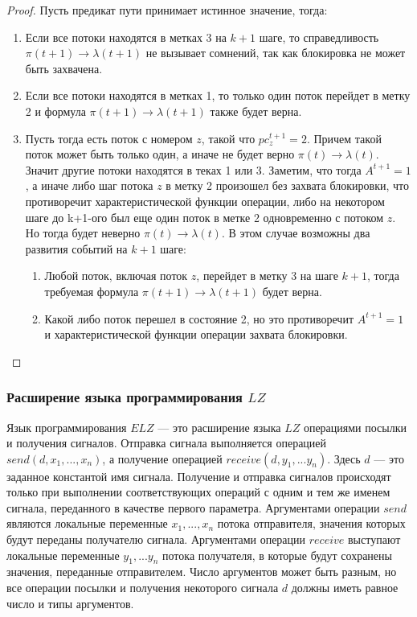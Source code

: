 \begin{proof}
Пусть предикат пути принимает истинное значение, тогда:
\begin{enumerate}
    \item Если все потоки находятся в метках 3 на $k+1$ шаге, то справедливость $\pi(t+1) \to \lambda(t+1)$ не вызывает сомнений, так как блокировка не может быть захвачена.
    \item Если все потоки находятся в метках 1, то только один поток перейдет в метку 2 и формула $\pi(t+1) \to \lambda(t+1)$ также будет верна.
    \item Пусть тогда есть поток с номером $z$, такой что $pc^{t+1}_z = 2$.
    Причем такой поток может быть только один, а иначе не будет верно $\pi(t) \to \lambda(t)$.
    Значит другие потоки находятся в теках 1 или 3.
    Заметим, что тогда $A^{t+1} = 1$, а иначе либо шаг потока $z$ в метку 2 произошел без захвата блокировки, что противоречит характеристической функции операции, либо на некотором шаге до k+1-ого был еще один поток в метке 2 одновременно с потоком $z$.
    Но тогда будет неверно $\pi(t) \to \lambda(t)$.
    В этом случае возможны два развития событий на $k+1$ шаге:
    \begin{enumerate}
        \item Любой поток, включая поток $z$, перейдет в метку 3 на шаге $k+1$, тогда требуемая формула $\pi(t+1) \to \lambda(t+1)$ будет верна.
        \item Какой либо поток перешел в состояние 2, но это противоречит $A^{t+1} = 1$ и характеристической функции операции захвата блокировки.
    \end{enumerate}
\end{enumerate}


\end{proof}

\subsubsection{Расширение языка программирования $LZ$}
Язык программирования $ELZ$ --- это расширение языка $LZ$ операциями посылки и получения сигналов.
Отправка сигнала выполняется операцией $send(d, x_1, ..., x_n)$, а получение операцией $receive(d, y_1, ... y_n)$. 
Здесь $d$ --- это заданное константой имя сигнала.
Получение и отправка сигналов происходят только при выполнении соответствующих операций с одним и тем же именем сигнала, переданного в качестве первого параметра.
Аргументами операции $send$ являются локальные переменные $x_1, ..., x_n$ потока отправителя, значения которых будут переданы получателю сигнала.
Аргументами операции $receive$ выступают локальные переменные $y_1, ... y_n$ потока получателя, в которые будут сохранены значения, переданные отправителем.
Число аргументов может быть разным, но все операции посылки и получения некоторого сигнала $d$ должны иметь равное число и типы аргументов.


